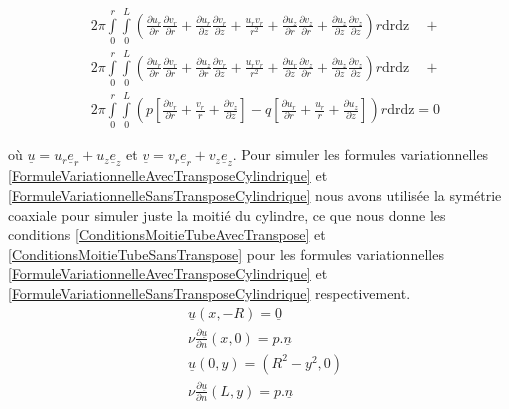 \documentclass[11pt,a4paper]{article}
\numberwithin{equation}{subsection}
\numberwithin{figure}{subsection}
\begin{document}
\begin{equation}
\begin{aligned}
& 2\pi\int\limits_0^r\int\limits_0^L \left(\frac{\partial u_r}{\partial r}\frac{\partial v_r}{\partial r} + \frac{\partial u_r}{\partial z}\frac{\partial v_r}{\partial z} + \frac{u_rv_r}{r^2} + \frac{\partial u_z}{\partial r}\frac{\partial v_z}{\partial r} + \frac{\partial u_z}{\partial z}\frac{\partial v_z}{\partial z}\right)r\mathrm{drdz}  \quad+ \\
& 2\pi\int\limits_0^r\int\limits_0^L \left(\frac{\partial u_r}{\partial r}\frac{\partial v_r}{\partial r} + \frac{\partial u_z}{\partial r}\frac{\partial v_r}{\partial z} + \frac{u_rv_r}{r^2} + \frac{\partial u_r}{\partial z}\frac{\partial v_z}{\partial r} + \frac{\partial u_z}{\partial z}\frac{\partial v_z}{\partial z}\right)r\mathrm{drdz}  \quad+ \\
& 2\pi\int\limits_0^r\int\limits_0^L \left(p\left[\frac{\partial v_r}{\partial r} + \frac{v_r}{r} + \frac{\partial v_z}{\partial z}\right] - q\left[\frac{\partial u_r}{\partial r} + \frac{u_r}{r} + \frac{\partial u_z}{\partial z}\right]\right) r\mathrm{drdz} = 0
\end{aligned} \label{FormuleVariationnelleAvecTransposeCylindrique}
\end{equation}

où $\underline{u} = u_r\underline{e}_r + u_z\underline{e}_z$ et $\underline{v} = v_r\underline{e}_r + v_z\underline{e}_z$. Pour simuler les formules variationnelles \ref{FormuleVariationnelleAvecTransposeCylindrique} et \ref{FormuleVariationnelleSansTransposeCylindrique} nous avons utilisée la symétrie coaxiale pour simuler juste la moitié du cylindre, ce que nous donne les conditions \ref{ConditionsMoitieTubeAvecTranspose} et \ref{ConditionsMoitieTubeSansTranspose} pour les formules variationnelles \ref{FormuleVariationnelleAvecTransposeCylindrique} et \ref{FormuleVariationnelleSansTransposeCylindrique} respectivement.
\begin{equation}
\begin{aligned}
& \underline{u}(x,-R) = \underline{0} \\
& \nu\frac{\partial\underline{u}}{\partial n}(x,0) = p.\underline{n} \\
& \underline{u}(0,y) = \left(R^2 - y^2, 0\right) \\
& \nu\frac{\partial\underline{u}}{\partial n}(L,y) = p.\underline{n}
\end{aligned} \label{ConditionsMoitieTubeSansTranspose}
\end{equation}
\end{document}
